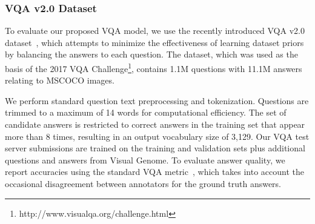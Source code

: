 \documentclass[10pt,twocolumn,letterpaper]{article}
\begin{document}
\subsubsection{VQA v2.0 Dataset}

To evaluate our proposed VQA model, we use the recently introduced VQA v2.0 dataset~\cite{balanced_vqa_v2}, which attempts to minimize the effectiveness of learning dataset priors by balancing the answers to each question. The dataset, which was used as the basis of the 2017 VQA Challenge\footnote{http://www.visualqa.org/challenge.html}, contains 1.1M questions with 11.1M answers relating to MSCOCO images. 

We perform standard question text preprocessing and tokenization. Questions are trimmed to a maximum of 14 words for computational efficiency. The set of candidate answers is restricted to correct answers in the training set that appear more than 8 times, resulting in an output vocabulary size of 3,129. Our VQA test server submissions are trained on the training and validation sets plus additional questions and answers from Visual Genome. To evaluate answer quality, we report accuracies using the standard VQA metric~\cite{VQA}, which takes into account the occasional disagreement between annotators for the ground truth answers.
\end{document}
